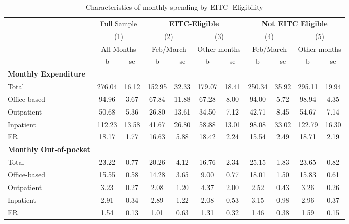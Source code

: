 \documentclass[smallcondensed,referee]{svjour3}
\begin{document}
\begin{table}[h!]
\centering
\begin{tabular}{l cccccccccc}\caption{Characteristics of monthly spending by EITC- Eligibility}\label{MonthlyTable1}
&&&& &&&&&&\\
\hline
   &\multicolumn{2}{c}{Full Sample}    &\multicolumn{4}{c}{\textbf{EITC-Eligible}}&\multicolumn{4}{c}{\textbf{Not EITC Eligible}}\\
                           &\multicolumn{2}{c}{(1)}  &\multicolumn{2}{c}{(2)}  &\multicolumn{2}{c}{(3)}  &\multicolumn{2}{c}{(4)}  &\multicolumn{2}{c}{(5)} \\
   &\multicolumn{2}{c}{All Months}    &\multicolumn{2}{c}{Feb/March}&\multicolumn{2}{c}{Other months}&\multicolumn{2}{c}{Feb/March}&\multicolumn{2}{c}{Other months}\\
                    &           b&          se&           b&          se&           b&          se&           b&          se&           b&          se\\
\hline
\textbf{Monthly Expenditure} &&&&&&&&\\
Total  &      276.04&       16.12&      152.95&       32.33&      179.07&       18.41&      250.34&       35.92&      295.11&       19.94\\
Office-based  &       94.96&        3.67&       67.84&       11.88&       67.28&        8.00&       94.00&        5.72&       98.94&        4.35\\
Outpatient &       50.68&        5.36&       26.80&       13.61&       34.50&        7.12&       42.71&        8.45&       54.67&        7.14\\
 Inpatient  &      112.23&       13.58&       41.67&       26.80&       58.88&       13.01&       98.08&       33.02&      122.79&       16.30\\
 ER       &       18.17&        1.77&       16.63&        5.88&       18.42&        2.24&       15.54&        2.49&       18.71&        2.19\\
 
 \textbf{Monthly Out-of-pocket} &&&&&&&&\\
Total &       23.22&        0.77&       20.26&        4.12&       16.76&        2.34&       25.15&        1.83&       23.65&        0.82\\
Office-based   &       15.55&        0.58&       14.28&        3.65&        9.00&        0.77&       18.01&        1.50&       15.83&        0.61\\
Outpatient  &        3.23&        0.27&        2.08&        1.20&        4.37&        2.00&        2.52&        0.43&        3.26&        0.26\\
 Inpatient   &        2.91&        0.34&        2.89&        1.22&        2.08&        0.53&        3.15&        0.98&        2.96&        0.37\\
 ER     &        1.54&        0.13&        1.01&        0.63&        1.31&        0.32&        1.46&        0.38&        1.59&        0.15\\


\end{tabular}
\end{table}
\end{document}
